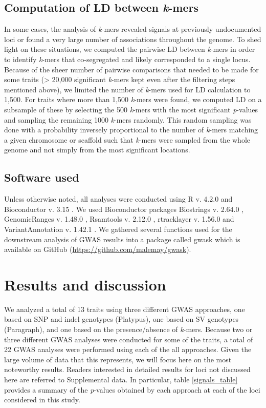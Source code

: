 \subsection*{Computation of LD between \emph{k}-mers}
\label{sv-gwas-ld-kmers}

In some cases, the analysis of \emph{k}-mers revealed signals at previously
undocumented loci or found a very large number of associations throughout the
genome. To shed light on these situations, we computed the pairwise LD between
\emph{k}-mers in order to identify \emph{k}-mers that co-segregated and
likely corresponded to a single locus. Because of the sheer number of pairwise
comparisons that needed to be made for some traits (> 20,000 significant
\emph{k}-mers kept even after the filtering steps mentioned above), we limited
the number of \emph{k}-mers used for LD calculation to 1,500. For traits where
more than 1,500 \emph{k}-mers were found, we computed LD on a subsample of
these by selecting the 500 \emph{k}-mers with the most significant
\emph{p}-values and sampling the remaining 1000 \emph{k}-mers randomly. This
random sampling was done with a probability inversely proportional to the
number of \emph{k}-mers matching a given chromosome or scaffold such that
\emph{k}-mers were sampled from the whole genome and not simply from the most
significant locations.

\subsection*{Software used}
\label{sv-gwas-software-used}

Unless otherwise noted, all analyses were conducted using R v. 4.2.0
\citep{r2022} and Bioconductor v. 3.15 \citep{huber2015}. We used Bioconductor
packages Biostrings v. 2.64.0 \citep{pages2022}, GenomicRanges v. 1.48.0
\citep{lawrence2013}, Rsamtools v. 2.12.0 \citep{rsamtools2022}, rtracklayer v.
1.56.0 \citep{lawrence2009} and VariantAnnotation v. 1.42.1
\citep{obenchain2014}.  We gathered several functions used for the downstream
analysis of GWAS results into a package called gwask which is available on
GitHub (\url{https://github.com/malemay/gwask}).

\section*{Results and discussion}
\label{sv-gwas-results-discussion}

We analyzed a total of 13 traits using three different GWAS approaches, one
based on SNP and indel genotypes (Platypus), one based on SV genotypes (Paragraph),
and one based on the presence/absence of \textit{k}-mers.
Because two or three different GWAS analyses were conducted for some of the traits, a
total of 22 GWAS analyses were performed using each of the all approaches.
Given the large volume of data that this represents, we will focus here on the
most noteworthy results. Readers interested in detailed results for loci not
discussed here are referred to Supplemental data. In particular, table \ref{signals_table}
provides a summary of the \textit{p}-values obtained by each approach at each
of the loci considered in this study.

